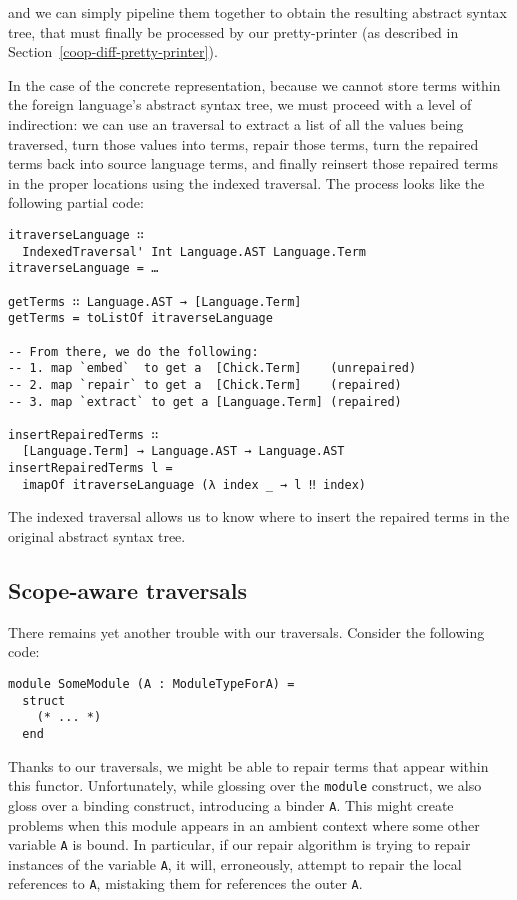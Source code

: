 \noindent
and we can simply pipeline them together to obtain the resulting abstract syntax
tree, that must finally be processed by our pretty-printer (as described in
Section~\ref{coop-diff-pretty-printer}).

In the case of the concrete representation, because we cannot store \Chick{}
terms within the foreign language's abstract syntax tree, we must proceed with a
level of indirection: we can use an  traversal to extract a list
of all the values being traversed, turn those values into \Chick{} terms, repair
those \Chick{} terms, turn the repaired terms back into source language terms,
and finally reinsert those repaired terms in the proper locations using the
indexed traversal.  The process looks like the following partial code:

\begin{verbatim}
itraverseLanguage ∷
  IndexedTraversal' Int Language.AST Language.Term
itraverseLanguage = …

getTerms ∷ Language.AST → [Language.Term]
getTerms = toListOf itraverseLanguage

-- From there, we do the following:
-- 1. map `embed`  to get a  [Chick.Term]    (unrepaired)
-- 2. map `repair` to get a  [Chick.Term]    (repaired)
-- 3. map `extract` to get a [Language.Term] (repaired)

insertRepairedTerms ∷
  [Language.Term] → Language.AST → Language.AST
insertRepairedTerms l =
  imapOf itraverseLanguage (λ index _ → l ‼ index)
\end{verbatim}

The indexed traversal allows us to know where to insert the repaired terms in
the original abstract syntax tree.

\subsection{Scope-aware traversals}

There remains yet another trouble with our traversals.  Consider the following
\OCaml{} code:

\begin{verbatim}
module SomeModule (A : ModuleTypeForA) =
  struct
    (* ... *)
  end
\end{verbatim}

Thanks to our traversals, we might be able to repair terms that appear within
this \OCaml{} functor\footnotemark{}.  Unfortunately, while glossing over the
\texttt{module} construct, we also gloss over a binding construct,
introducing a binder \texttt{A}.  This might create problems when
this module appears in an ambient context where some other variable
\texttt{A} is bound.  In particular, if our repair algorithm is
trying to repair instances of the variable \texttt{A}, it will,
erroneously, attempt to repair the local references to \texttt{A},
mistaking them for references the outer \texttt{A}.

